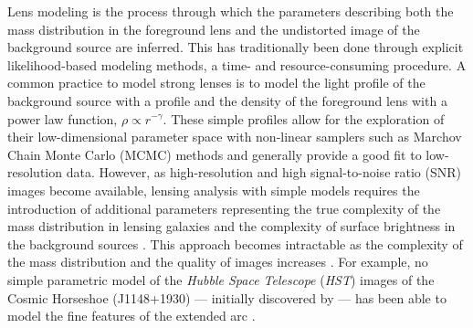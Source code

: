 Lens modeling is the process through which the parameters describing both the mass distribution in the 
foreground lens and the undistorted image of the background source are inferred.
This has traditionally been done through explicit likelihood-based modeling methods, a time- and resource-consuming procedure. 
A common practice to model strong lenses is to model the light profile of the background source with a \citet{Sersic1963} profile and the density of the foreground lens with a power law function, $\rho \propto r^{-\gamma}$. 
These simple profiles allow for the exploration of their low-dimensional parameter space with non-linear samplers such as Marchov Chain Monte Carlo (MCMC) methods \citep[e.g.,][]{Koopmans2006,Barnabe2009,Auger2010} and generally provide a good fit to low-resolution data. 
However, as high-resolution and high signal-to-noise ratio (SNR) images become available, lensing analysis with simple models requires the introduction of additional parameters representing the true complexity of the mass distribution in lensing galaxies and the complexity of surface brightness in the background sources \citep[e.g.,][]{Sluse2017,Wong2017,Birrer2019,Rusu2019, Rusu2017,Li2021}. 
This approach becomes intractable as the complexity of the mass distribution and the quality of images increases \citep[e.g.,][]{Schmidt2022}. For example,
no simple parametric model of the \textit{Hubble Space Telescope} (\textit{HST}) images of the Cosmic Horseshoe (J1148+1930) --- initially discovered by \citet{Belokurov2007} --- has been able to model the fine features of the extended arc \citep[e.g.,][]{Bellagamba2016,Cheng2019,Schuldt2019}.

